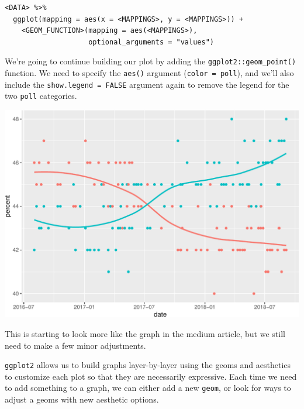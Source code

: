 \documentclass[letterpaper,12pt,twoside,]{pinp}
\begin{document}
\begin{verbatim}
<DATA> %>% 
  ggplot(mapping = aes(x = <MAPPINGS>, y = <MAPPINGS>)) + 
    <GEOM_FUNCTION>(mapping = aes(<MAPPINGS>), 
                    optional_arguments = "values")
\end{verbatim}

We're going to continue building our plot by adding the
\texttt{ggplot2::geom\_point()} function. We need to specify the
\texttt{aes()} argument (\texttt{color\ =\ poll}), and we'll also
include the \texttt{show.legend\ =\ FALSE} argument again to remove the
legend for the two \texttt{poll} categories.

\begin{Shaded}
\begin{Highlighting}[]
\SpecialCharTok{+} \NormalTok{(}\NormalTok{(} \NormalTok{)}
\end{Highlighting}
\end{Shaded}

\begin{center}\includegraphics{03-intro-to-ggplot2_files/figure-latex/geom_point-1} \end{center}

This is starting to look more like the graph in the medium article, but
we still need to make a few minor adjustments.

\texttt{ggplot2} allows us to build graphs layer-by-layer using the
geoms and aesthetics to customize each plot so that they are necessarily
expressive. Each time we need to add something to a graph, we can either
add a new \texttt{geom}, or look for ways to adjust a geoms with new
aesthetic options.
\end{document}

